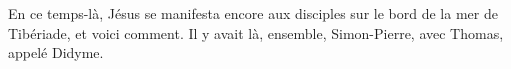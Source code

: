 En ce temps-là, Jésus se manifesta encore aux disciples
		sur le bord de la mer de Tibériade,
	et voici comment.
Il y avait là, ensemble, Simon-Pierre, avec Thomas, appelé Didyme.
